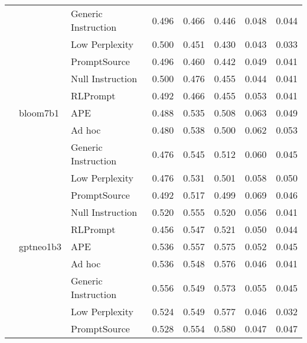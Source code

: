 \begin{supertabular}{lllrrrrr}
              &        & Generic Instruction &            0.496 &           0.466 &          0.446 &        0.048 &    0.044 \\
              &        & Low Perplexity &            0.500 &           0.451 &          0.430 &        0.043 &    0.033 \\
              &        & PromptSource &            0.496 &           0.460 &          0.442 &        0.049 &    0.041 \\
              &        & Null Instruction &            0.500 &           0.476 &          0.455 &        0.044 &    0.041 \\
              &        & RLPrompt &            0.492 &           0.466 &          0.455 &        0.053 &    0.041 \\
              & bloom7b1 & APE &            0.488 &           0.535 &          0.508 &        0.063 &    0.049 \\
              &        & Ad hoc &            0.480 &           0.538 &          0.500 &        0.062 &    0.053 \\
              &        & Generic Instruction &            0.476 &           0.545 &          0.512 &        0.060 &    0.045 \\
              &        & Low Perplexity &            0.476 &           0.531 &          0.501 &        0.058 &    0.050 \\
              &        & PromptSource &            0.492 &           0.517 &          0.499 &        0.069 &    0.046 \\
              &        & Null Instruction &            0.520 &           0.555 &          0.520 &        0.056 &    0.041 \\
              &        & RLPrompt &            0.456 &           0.547 &          0.521 &        0.050 &    0.044 \\
              & gptneo1b3 & APE &            0.536 &           0.557 &          0.575 &        0.052 &    0.045 \\
              &        & Ad hoc &            0.536 &           0.548 &          0.576 &        0.046 &    0.041 \\
              &        & Generic Instruction &            0.556 &           0.549 &          0.573 &        0.055 &    0.045 \\
              &        & Low Perplexity &            0.524 &           0.549 &          0.577 &        0.046 &    0.032 \\
              &        & PromptSource &            0.528 &           0.554 &          0.580 &        0.047 &    0.047 \\

\end{supertabular}
